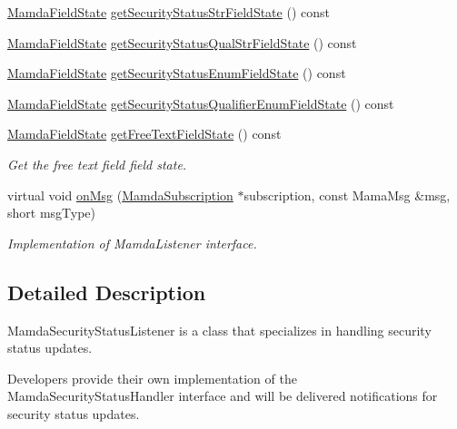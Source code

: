 \begin{CompactItemize}
\hyperlink{namespaceWombat_93aac974f2ab713554fd12a1fa3b7d2a}{Mamda\-Field\-State} \hyperlink{classWombat_1_1MamdaSecStatusListener_3ab7eddbc0cb17286b8d14330470a927}{get\-Security\-Status\-Str\-Field\-State} () const 
\item 
\hyperlink{namespaceWombat_93aac974f2ab713554fd12a1fa3b7d2a}{Mamda\-Field\-State} \hyperlink{classWombat_1_1MamdaSecStatusListener_31cde3bb8da5542a23a39227caa7106a}{get\-Security\-Status\-Qual\-Str\-Field\-State} () const 
\item 
\hyperlink{namespaceWombat_93aac974f2ab713554fd12a1fa3b7d2a}{Mamda\-Field\-State} \hyperlink{classWombat_1_1MamdaSecStatusListener_835f73068705630588709dcdaae9ccda}{get\-Security\-Status\-Enum\-Field\-State} () const 
\item 
\hyperlink{namespaceWombat_93aac974f2ab713554fd12a1fa3b7d2a}{Mamda\-Field\-State} \hyperlink{classWombat_1_1MamdaSecStatusListener_e3202a65672a14d3d890a4318f391856}{get\-Security\-Status\-Qualifier\-Enum\-Field\-State} () const 
\item 
\hyperlink{namespaceWombat_93aac974f2ab713554fd12a1fa3b7d2a}{Mamda\-Field\-State} \hyperlink{classWombat_1_1MamdaSecStatusListener_b0f983bb92ba0f415d5e60ed6405c157}{get\-Free\-Text\-Field\-State} () const 
\begin{CompactList}\small\item\em Get the free text field field state. \item\end{CompactList}\item 
virtual void \hyperlink{classWombat_1_1MamdaSecStatusListener_09bafa70e9b3d41a37175135bd355d72}{on\-Msg} (\hyperlink{classWombat_1_1MamdaSubscription}{Mamda\-Subscription} $\ast$subscription, const Mama\-Msg \&msg, short msg\-Type)
\begin{CompactList}\small\item\em Implementation of Mamda\-Listener interface. \item\end{CompactList}\end{CompactItemize}


\subsection{Detailed Description}
Mamda\-Security\-Status\-Listener is a class that specializes in handling security status updates. 

Developers provide their own implementation of the Mamda\-Security\-Status\-Handler interface and will be delivered notifications for security status updates.

